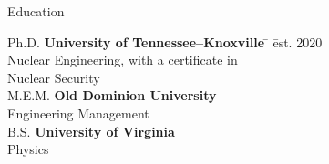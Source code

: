 \documentclass{resume3} %
\begin{document}

\begin{rSection}{Education}

\begin{tabbing}
Ph.D. \hspace*{2 em}\= \textbf{University of Tennessee--Knoxville} \hspace*{5em} \= \hspace*{15em} \= est. 2020 \\
      \> Nuclear Engineering, with a certificate in \\ \> Nuclear Security \\
%
M.E.M. \hspace*{2 em}\> \textbf{Old Dominion University} \>  \\
      \> Engineering Management \\
%
B.S. \hspace*{2 em}\> \textbf{University of Virginia} \>  \\
      \> Physics
\end{tabbing}
\end{rSection}
\end{document}
